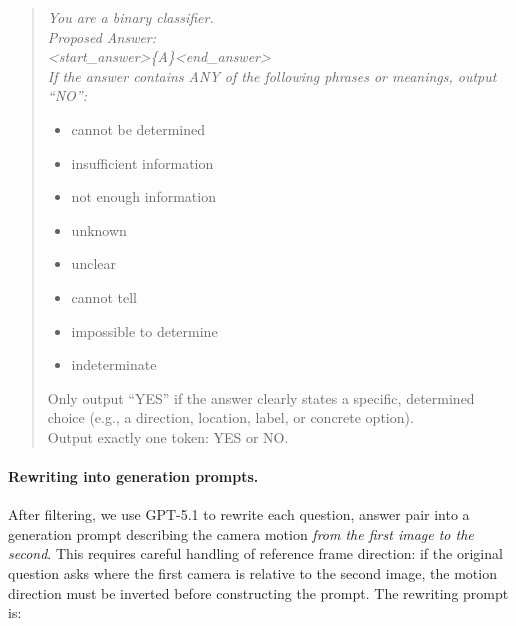 \begin{quote}
\itshape
You are a binary classifier.\\
Proposed Answer:\\
\textless start\_answer\textgreater\{A\}\textless end\_answer\textgreater\\
If the answer contains ANY of the following phrases or meanings, output ``NO'':
\begin{itemize}
    \item cannot be determined
    \item insufficient information
    \item not enough information
    \item unknown
    \item unclear
    \item cannot tell
    \item impossible to determine
    \item indeterminate
\end{itemize}
Only output ``YES'' if the answer clearly states a specific, determined choice (e.g., a direction, location, label, or concrete option).\\
Output exactly one token: YES or NO.
\end{quote}
 
\paragraph{Rewriting into generation prompts.}
After filtering, we use GPT-5.1 to rewrite each question, answer pair into a generation prompt describing the camera motion \emph{from the first image to the second}. This requires careful handling of reference frame direction: if the original question asks where the first camera is relative to the second image, the motion direction must be inverted before constructing the prompt. The rewriting prompt is:
 
